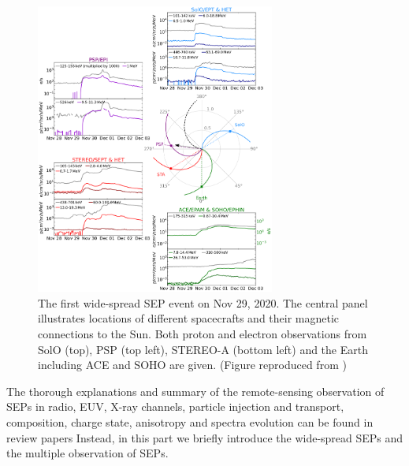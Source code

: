 \begin{figure}[!htbp]
	\centering
	\includegraphics[width = 0.7\textwidth, height = 0.5\textheight]{images/2020-11-29_overview_plot.png}
	\caption[The first wide-spread \acl{SEP} event on Nov 29, 2020]{The first wide-spread \acl{SEP} event on Nov 29, 2020. The central panel illustrates locations of different spacecrafts and their magnetic connections to the Sun. Both proton and electron observations from \ac{SolO} (top), \ac{PSP} (top left), \ac{STEREO}-A (bottom left) and the Earth including \ac{ACE} and \ac{SOHO} are given. (Figure reproduced from \citet{Kollhoff-2021})}
	\label{Fig:SEP_widespread}
\end{figure}

The thorough explanations and summary of the remote-sensing observation of \acp{SEP} in radio, EUV, X-ray channels, particle injection and transport, composition, charge state, anisotropy and spectra evolution can be found in review papers \citep{reames2013two, Desai_Diacalone2016LRSP, Reames2021LNP}
Instead, in this part we briefly introduce the wide-spread \acp{SEP} and the multiple observation of \acp{SEP}.

